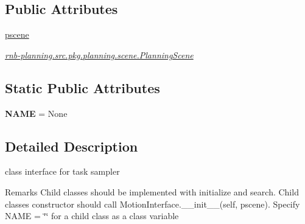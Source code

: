 \subsection*{Public Attributes}
\begin{DoxyCompactItemize}
\item 
\mbox{\label{classrnb-planning_1_1src_1_1pkg_1_1planning_1_1task_1_1interface_1_1_task_interface_aa7ffb430242b8cf040b951cf2828d598}} 
\hyperlink{classrnb-planning_1_1src_1_1pkg_1_1planning_1_1task_1_1interface_1_1_task_interface_aa7ffb430242b8cf040b951cf2828d598}{pscene}
\begin{DoxyCompactList}\small\item\em \hyperlink{classrnb-planning_1_1src_1_1pkg_1_1planning_1_1scene_1_1_planning_scene}{rnb-\/planning.\+src.\+pkg.\+planning.\+scene.\+Planning\+Scene} \end{DoxyCompactList}\end{DoxyCompactItemize}
\subsection*{Static Public Attributes}
\begin{DoxyCompactItemize}
\item 
\mbox{\label{classrnb-planning_1_1src_1_1pkg_1_1planning_1_1task_1_1interface_1_1_task_interface_a8b9861dcf1d1b85f611429508b5810c0}} 
{\bfseries N\+A\+ME} = None
\end{DoxyCompactItemize}


\subsection{Detailed Description}
class interface for task sampler 

\begin{DoxyRemark}{Remarks}
Child classes should be implemented with initialize and search. Child classes\textquotesingle{} constructor should call Motion\+Interface.\+\_\+\+\_\+init\+\_\+\+\_\+(self, pscene). Specify N\+A\+ME = \char`\"{}\char`\"{} for a child class as a class variable 
\end{DoxyRemark}


